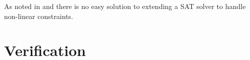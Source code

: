 As noted in \cite{le_berre_dependency_2009} and \cite{leBerre2010} there is no easy solution to extending a SAT solver to handle non-linear constraints.








\section{Verification}









